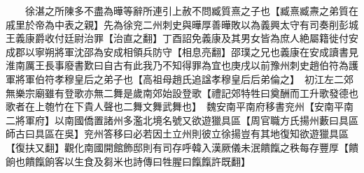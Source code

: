 　　徐湛之所陳多不盡為曄等辭所連引上赦不問臧質熹之子也【臧熹臧燾之弟質在戚里於帝為中表之親】先為徐兖二州刺史與曄厚善曄敗以為義興太守有司奏削彭城王義康爵收付廷尉治罪【治直之翻】丁酉詔免義康及其男女皆為庶人絶屬籍徙付安成郡以寧朔將軍沈邵為安成相領兵防守【相息亮翻】邵璞之兄也義康在安成讀書見淮南厲王長事廢書歎曰自古有此我乃不知得罪為宜也庚戌以前豫州刺史趙伯符為護軍將軍伯符孝穆皇后之弟子也【高祖母趙氏追諡孝穆皇后后弟倫之】　初江左二郊無樂宗廟雖有登歌亦無二舞是歲南郊始設登歌【禮記郊特牲曰奠酬而工升歌發德也歌者在上匏竹在下貴人聲也二舞文舞武舞也】　魏安南平南府移書兖州【安南平南二將軍府】以南國僑置諸州多濫北境名號又欲遊獵具區【周官職方氏揚州藪曰具區師古曰具區在吳】兖州答移曰必若因土立州則彼立徐揚豈有其地復知欲遊獵具區【復扶又翻】觀化南國開館飾邸則有司存呼韓入漢厥儀未泯饋餼之秩每存豐厚【饋餉也饋餼餉客以生食及芻米也詩傳曰牲腥曰餼餼許既翻】

